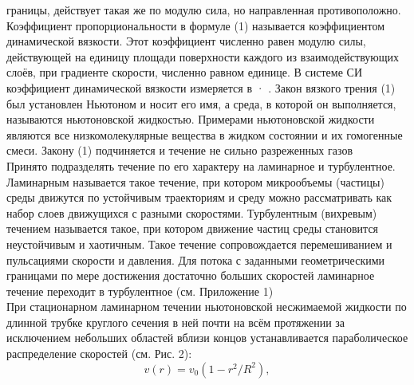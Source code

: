 \documentclass[a4paper]{article}
\begin{document}
границы, действует такая же по модулю сила, но направленная
противоположно. Коэффициент пропорциональности в формуле
(1) называется коэффициентом динамической вязкости. Этот коэффициент численно равен модулю силы, действующей на единицу площади поверхности каждого из взаимодействующих слоёв,
при градиенте скорости, численно равном единице. В системе СИ
коэффициент динамической вязкости измеряется в · .
Закон вязкого трения (1) был установлен Ньютоном и носит
его имя, а среда, в которой он выполняется, называются ньютоновской жидкостью. Примерами ньютоновской жидкости являются все низкомолекулярные вещества в жидком состоянии и их
гомогенные смеси. Закону (1) подчиняется и течение не сильно разреженных газов\\
Принято подразделять течение по его характеру на ламинарное и турбулентное. Ламинарным называется такое течение, при
котором микрообъемы (частицы) среды движутся по устойчивым
траекториям и среду можно рассматривать как набор слоев движущихся с разными скоростями. Турбулентным (вихревым) течением называется такое, при котором движение частиц среды
становится неустойчивым и хаотичным. Такое течение сопровождается перемешиванием и пульсациями скорости и давления. Для
потока с заданными геометрическими границами по мере достижения достаточно больших скоростей ламинарное течение переходит в турбулентное (см. Приложение 1)\\
При стационарном ламинарном течении ньютоновской несжимаемой жидкости по длинной трубке круглого сечения в ней почти на всём протяжении за исключением небольших областей
вблизи концов устанавливается параболическое распределение скоростей (см. Рис. 2):
\begin{equation}
v(r) = v_0(1-r^2/R^2),
\end{equation}
\end{document}
